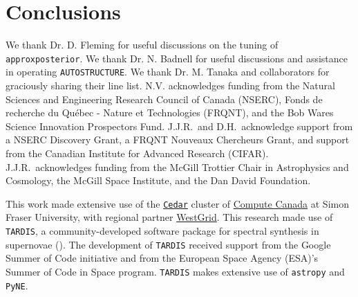 \documentclass[twocolumn]{aastex63}
\begin{document}
\section{Conclusions}\label{sec:conclusions}

\acknowledgments
We thank Dr. D. Fleming for useful discussions on the tuning of \texttt{approxposterior}. We thank Dr. N. Badnell for useful discussions and assistance in operating \texttt{AUTOSTRUCTURE}. We thank Dr. M. Tanaka and collaborators for graciously sharing their line list. N.V. acknowledges funding from the Natural Sciences and Engineering Research Council of Canada (NSERC), Fonds de recherche du Qu\'ebec - Nature et Technologies (FRQNT), and the Bob Wares Science Innovation Prospectors Fund. J.J.R.\ and D.H.\ acknowledge support from a NSERC Discovery Grant, a  FRQNT Nouveaux Chercheurs Grant, and support from the Canadian Institute for Advanced Research (CIFAR).  J.J.R.\ acknowledges funding from the McGill Trottier Chair in Astrophysics and Cosmology, the McGill Space Institute, and the Dan David Foundation.

This work made extensive use of the \href{https://docs.computecanada.ca/wiki/Cedar}{\texttt{Cedar}} cluster of \href{https://www.computecanada.ca/home/}{Compute Canada} at Simon Fraser University, with regional partner \href{https://www.westgrid.ca/}{WestGrid}. This research made use of \texttt{TARDIS}, a community-developed software package for spectral synthesis in supernovae (\citealt{kerzendorf14}). The development of \texttt{TARDIS} received support from the Google Summer of Code initiative and from the European Space Agency (ESA)'s Summer of Code in Space program. \texttt{TARDIS} makes extensive use of \texttt{astropy} and \texttt{PyNE}. 
\newline
\end{document}

